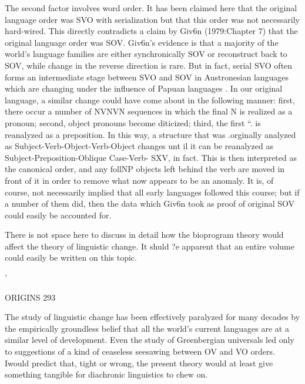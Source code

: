 The second factor involves word order. It has been claimed here that the original language order was SVO with serialization but that this order was not necessarily hard-wired. This directly contradicts a claim by Giv6n (1979:Chapter 7) that the original language order was SOV. Giv6n's evidence is that a majority of the world's language families are either synchronically SOV or reconstruct back to SOV, while change in the reverse direction is rare. But in fact, serial SVO often forms an intermediate stage between SVO and SOV in Austro\-nesian languages which are changing under the influence of Papuan languages \citep{Bradshaw1979}. In our original language, a similar change could have come about in the following manner: first, there occur a number of NVNVN sequences in which the final N is realized as a pronoun; second, object pronouns become diticized; third, the first ``. is reanalyzed as a preposition. In this way, a structure that was .or\-ginally analyzed as Subject-Verb-Object-Verb-Object changes unt il it can be reanalyzed as Subject-Preposition-Oblique Case-Verb- SXV, in fact. This is then interpreted as the canonical order, and any foll\-NP objects left behind the verb are moved in front of it in order to remove what now appears to be an anomaly. It is, of course, not necessarily implied that all early languages followed this course; but if a number of them did, then the data which Giv6n took as proof of original SOV could easily be accounted for.

There is not space here to discuss in detail how the bioprogram theory would affect the theory of linguistic change. It shuld ?e apparent that an entire volume could easily be written on this topic.

'

ORIGINS 293

The study of linguistic change has been effectively paralyzed for many decades by the empirically groundless belief that all the world's current languages are at a similar level of development. Even the study of Greenbergian universals led only to suggestions of a kind of ceaseless seesawing between OV and VO orders. Iwould predict that, tight or wrong, the present theory would at least give something tangible for diachronic linguistics to chew on.

